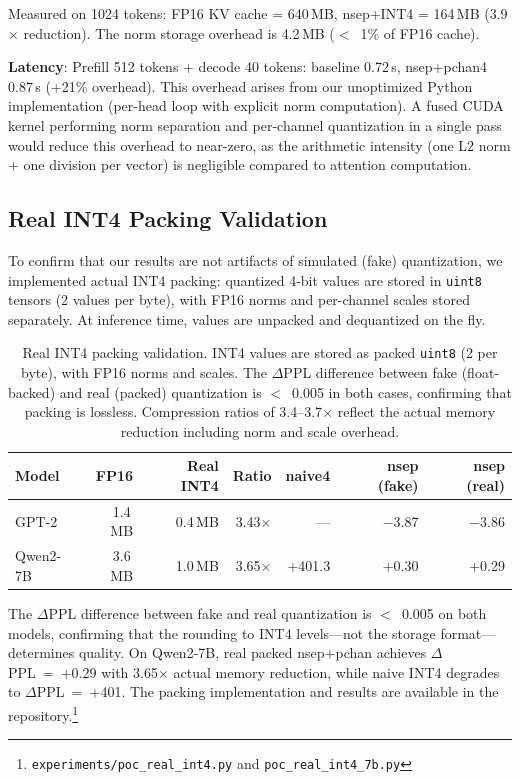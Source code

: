 \documentclass[11pt]{article}
\begin{document}
Measured on 1024 tokens: FP16 KV cache = 640\,MB, nsep+INT4 = 164\,MB (3.9$\times$ reduction). The norm storage overhead is 4.2\,MB ($<$~1\% of FP16 cache).

\textbf{Latency}: Prefill 512 tokens + decode 40 tokens: baseline 0.72\,s, nsep+pchan4 0.87\,s (+21\% overhead). This overhead arises from our unoptimized Python implementation (per-head loop with explicit norm computation). A fused CUDA kernel performing norm separation and per-channel quantization in a single pass would reduce this overhead to near-zero, as the arithmetic intensity (one L2 norm + one division per vector) is negligible compared to attention computation.

\subsection{Real INT4 Packing Validation}

To confirm that our results are not artifacts of simulated (fake) quantization, we implemented actual INT4 packing: quantized 4-bit values are stored in \texttt{uint8} tensors (2 values per byte), with FP16 norms and per-channel scales stored separately. At inference time, values are unpacked and dequantized on the fly.

\begin{table}[h]
\centering
\small
\begin{tabular}{lrrrrrr}
\toprule
Model & FP16 & Real INT4 & Ratio & naive4 & nsep (fake) & nsep (real) \\
\midrule
GPT-2 & 1.4\,MB & 0.4\,MB & 3.43$\times$ & --- & $-$3.87 & $-$3.86 \\
Qwen2-7B & 3.6\,MB & 1.0\,MB & 3.65$\times$ & +401.3 & +0.30 & +0.29 \\
\bottomrule
\end{tabular}
\caption{Real INT4 packing validation. INT4 values are stored as packed \texttt{uint8} (2 per byte), with FP16 norms and scales. The $\Delta$PPL difference between fake (float-backed) and real (packed) quantization is $<$~0.005 in both cases, confirming that packing is lossless. Compression ratios of 3.4--3.7$\times$ reflect the actual memory reduction including norm and scale overhead.}
\label{tab:realint4}
\end{table}

The $\Delta$PPL difference between fake and real quantization is $<$~0.005 on both models, confirming that the rounding to INT4 levels---not the storage format---determines quality. On Qwen2-7B, real packed nsep+pchan achieves $\Delta$PPL~=~+0.29 with 3.65$\times$ actual memory reduction, while naive INT4 degrades to $\Delta$PPL~=~+401. The packing implementation and results are available in the repository.\footnote{\texttt{experiments/poc\_real\_int4.py} and \texttt{poc\_real\_int4\_7b.py}}
\end{document}
